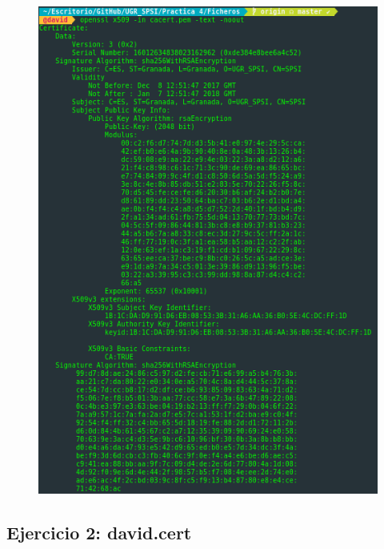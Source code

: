 \documentclass[10pt,a4paper,spanish]{report}
\begin{document}
\begin{figure}[!hbp]
 \centering  \includegraphics[width=1\textwidth]{./Imagenes/6_1.png}
\end{figure}

\newpage
\subsection*{Ejercicio 2: david.cert}
\end{document}
